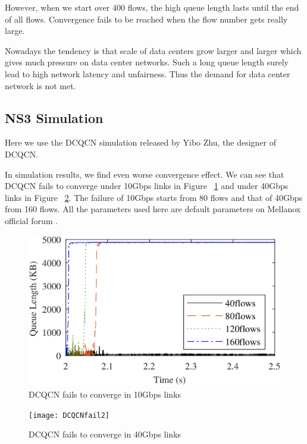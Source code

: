 \documentclass[12pt,a4paper]{article}
\begin{document}
However, when we start over 400 flows, the high queue length lasts until the end of all flows.
Convergence fails to be reached when the flow number gets really large.

Nowadays the tendency is that scale of data centers grow larger and larger which gives much pressure on data center networks.
Such a long queue length surely lead to high network latency and unfairness.
Thus the demand for data center network is not met.

\subsection{NS3 Simulation}

Here we use the DCQCN simulation \cite{DCQCNsim} released by Yibo Zhu, the designer of DCQCN.

In simulation results, we find even worse convergence effect.
We can see that DCQCN fails to converge under 10Gbps links in Figure ~\ref{fig:DCQCNfail1}
and under 40Gbps links in Figure ~\ref{fig:DCQCNfail2}.
The failure of 10Gbps starts from 80 flows and that of 40Gbps from 160 flows.
All the parameters used here are default parameters on Mellanox official forum \cite{MellanoxOfficial}.

\begin{figure}[h!]
	\begin{center}
		\includegraphics[width=5in]{DCQCNfail1}
		\caption{DCQCN fails to converge in 10Gbps links}
		\label{fig:DCQCNfail1}
	\end{center}
\end{figure}

\begin{figure}[h!]
	\begin{center}
		\texttt{[image: DCQCNfail2]}
		\caption{DCQCN fails to converge in 40Gbps links}
		\label{fig:DCQCNfail2}
	\end{center}
\end{figure}
\end{document}
